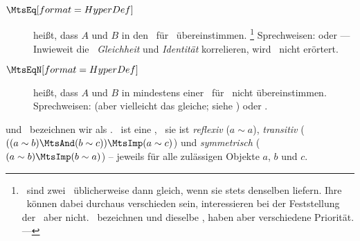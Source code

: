 \begin{description}
	\item[$\defSym{\MtsEq}$]  \label{def:Gleichheit}
	 heißt, dass $A$ und $B$ in den \interessierendenEigenschaften\ für \MtsEq\ übereinstimmen.%
	\footnote{%
		\textZB\ sind zwei \Junktoren\ üblicherweise dann gleich, wenn sie stets denselben \emph{\Wahrheitswert} liefern.
		Ihre \Bezeichnungen\ können dabei durchaus verschieden sein, interessieren bei der Feststellung der \Gleichheit\ aber nicht.
		\textZB\ bezeichnen \chrqt{\MtsAnd} und \chrqt{\MtsUnd} dieselbe \Operation, haben aber verschiedene Priorität.
		--- 
	}
	Sprechweisen:  oder 
	--- Inwieweit die \Begriffe\ \emph{Gleichheit} und \emph{Identität} korrelieren, wird \hier\ nicht erörtert.
	\item[$\defSym{\MtsEqN}$]  \label{def:Ungleichheit}
	 heißt, dass $A$ und $B$ in mindestens einer \interessierendenEigenschaft\ für \MtsEq\ nicht übereinstimmen.
	Sprechweisen:  (aber vielleicht das gleiche; siehe \MtsEquiv) oder .
\end{description}

\MtsEq und \MtsEqN\ bezeichnen wir als  .
\Gleichheit\ ist eine , \textdh\ sie ist \emph{reflexiv} ($a \sim a$), \emph{transitiv} ($((a \sim b) \MtsAnd (b \sim c)) \MtsImp (a \sim c)$) und \emph{symmetrisch} ($(a \sim b) \MtsImp (b \sim a)$)
-- jeweils für alle zulässigen Objekte $a$, $b$ und $c$.


